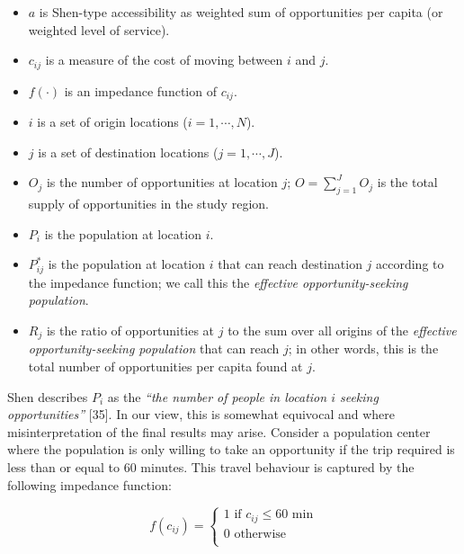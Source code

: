 \documentclass[10pt,letterpaper]{article}
\providecommand{\tightlist}{%
  \setlength{\itemsep}{0pt}\setlength{\parskip}{0pt}}
\begin{document}
\begin{itemize}
\tightlist
\item
  \(a\) is Shen-type accessibility as weighted sum of opportunities per
  capita (or weighted level of service).
\item
  \(c_{ij}\) is a measure of the cost of moving between \(i\) and \(j\).
\item
  \(f(\cdot)\) is an impedance function of \(c_{ij}\).
\item
  \(i\) is a set of origin locations (\(i = 1,\cdots,N\)).
\item
  \(j\) is a set of destination locations (\(j = 1,\cdots,J\)).
\item
  \(O_j\) is the number of opportunities at location \(j\);
  \(O = \sum_{j=1}^J O_j\) is the total supply of opportunities in the
  study region.
\item
  \(P_i\) is the population at location \(i\).
\item
  \(P_{ij}^*\) is the population at location \(i\) that can reach
  destination \(j\) according to the impedance function; we call this
  the \emph{effective opportunity-seeking population}.
\item
  \(R_j\) is the ratio of opportunities at \(j\) to the sum over all
  origins of the \emph{effective opportunity-seeking population} that
  can reach \(j\); in other words, this is the total number of
  opportunities per capita found at \(j\).
\end{itemize}

Shen describes \(P_i\) as the \emph{``the number of people in location
\(i\) seeking opportunities''} {[}35{]}. In our view, this is somewhat
equivocal and where misinterpretation of the final results may arise.
Consider a population center where the population is only willing to
take an opportunity if the trip required is less than or equal to 60
minutes. This travel behaviour is captured by the following impedance
function:

\begin{equation}
\label{eq:binary-impedance}
f(c_{ij}) =
\begin{cases}
1\text{ if }c_{ij}\leq60\text{ min}\\
0\text{ otherwise}\\
\end{cases}
\end{equation}
\end{document}
